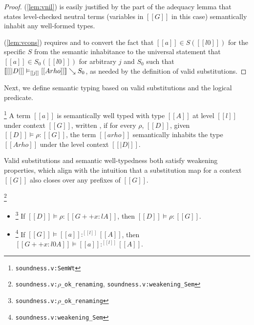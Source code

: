 \documentclass[acmsmall, screen=true, nonacm=true,
  review=\ifpublic false\else true\fi,
  anonymous=\ifanonymous true\else false\fi
]{acmart}
\DeclarePairedDelimiter{\bracks}{\llbracket}{\rrbracket}
\newcommand{\suppl}[3]{{\scriptsize\texttt{#2:#3}}}
\newcommand{\judgement}[1]{{\setlength{\fboxsep}{1.5pt}\fbox{#1}}}
\newcommand{\interp}[4]{\bracks{#1 \vDash_{#2} #3} \searrow #4}
\newcommand{\member}[3]{#1 \in #3(#2)}
\newcommand{\sws}[3]{#1 \vDash #2 : #3}
\newcommand{\swt}[4]{#1 \vDash #2 :^{#3} #4}
\newlength{\punctwidth}
\newcommand{\stack}[1]{%
  \settowidth{\punctwidth}{#1}%
  \hspace*{-\the\punctwidth}%
}
\begin{document}
\begin{proof}
  (\ref{lem:vnil}) is easily justified by the part of the adequacy lemma
  that states level-checked neutral terms (variables in $[[G]]$ in
  this case) semantically inhabit any well-formed types.

  (\ref{lem:vcons}) requires  and
   to convert the fact that
  $\member{[[a]]}{[[l0]]}{S}$ for the specific $S$ from the
  semantic inhabitance to the universal statement that
  $\member{[[a]]}{[[l0]]}{S_0}$ for arbitrary $j$ and $S_0$ such that
  $\interp{[[|D|]]}{[[j]]}{[[A { rho }]]}{S_0}$, as needed by the
  definition of valid substitutions.
\end{proof}


Next, we define semantic typing based on valid substitutions and the logical predicate.

\begin{definition}
  \label{def:semwt}
  \stack{.~}\footnote{\suppl{theories}{soundness.v}{SemWt}}
  A term $[[a]]$ is semantically well typed with type $[[A]]$
  at level $[[l]]$ under context $[[G]]$,
  written \judgement{$\swt{[[G]]}{[[a]]}{[[l]]}{[[A]]}$},
  if for every $\rho$, $[[D]]$,
  given $\sws{[[D]]}{\rho}{[[G]]}$,
  the term $[[a {rho}]]$ semantically inhabits the type $[[A {rho}]]$
  under the level context $[[|D|]]$.
\end{definition}

Valid substitutions and semantic well-typedness both satisfy weakening
properties,
which align with the intuition that a
substitution map for a context $[[G]]$ also closes over any
prefixes of $[[G]]$.

\begin{lemma}
  \stack{.~}\footnote{\suppl{theories}{soundness.v}{$\rho$\_ok\_renaming}, \suppl{theories}{soundness.v}{weakening\_Sem}}
  \label{lem:semweak}
  \leavevmode
  \begin{itemize}
    \item \stack{~}\footnote{\suppl{theories}{soundness.v}{$\rho$\_ok\_renaming}}
      If $\sws{[[D]]}{\rho}{[[G ++ x : l A]]}$, then $\sws{[[D]]}{\rho}{[[G]]}$.
    \item \stack{~}\footnote{\suppl{theories}{soundness.v}{weakening\_Sem}}
      If $\swt{[[G]]}{[[a]]}{[[l]]}{[[A]]}$,
      then $\swt{[[G ++ x : l0 A]]}{[[a]]}{[[l]]}{[[A]]}$.
  \end{itemize}
\end{lemma}
\end{document}
